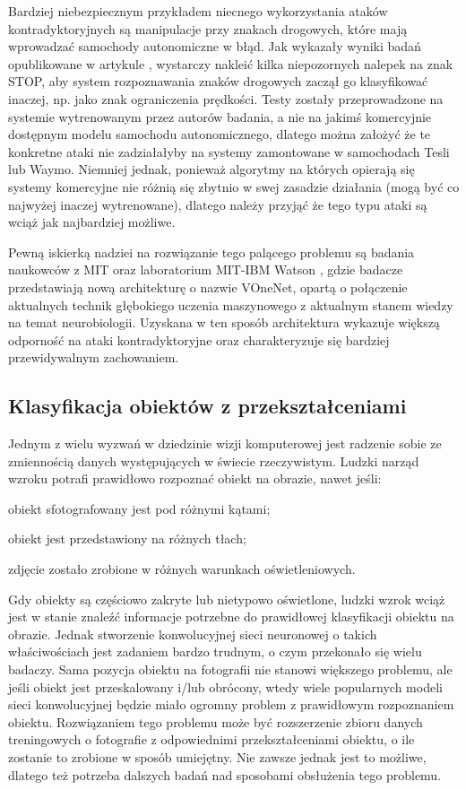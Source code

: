 Bardziej niebezpiecznym przykładem niecnego wykorzystania ataków kontradyktoryjnych są manipulacje przy znakach drogowych, które mają wprowadzać samochody autonomiczne w błąd. Jak wykazały wyniki badań opublikowane w artykule \cite{adversarial:roadSignAttacks}, wystarczy nakleić kilka niepozornych nalepek na znak STOP, aby system rozpoznawania znaków drogowych zaczął go klasyfikować inaczej, np. jako znak ograniczenia prędkości. Testy zostały przeprowadzone na systemie wytrenowanym przez autorów badania, a nie na jakimś komercyjnie dostępnym modelu samochodu autonomicznego, dlatego można założyć że te konkretne ataki nie zadziałałyby na systemy zamontowane w samochodach Tesli lub Waymo. Niemniej jednak, ponieważ algorytmy na których opierają się systemy komercyjne nie różnią się zbytnio w swej zasadzie działania (mogą być co najwyżej inaczej wytrenowane), dlatego należy przyjąć że tego typu ataki są wciąż jak najbardziej możliwe.

Pewną iskierką nadziei na rozwiązanie tego palącego problemu są badania naukowców z MIT oraz laboratorium MIT-IBM Watson \cite{cnns:neuroscienceProtection}, gdzie badacze przedstawiają nową architekturę o nazwie VOneNet, opartą o połączenie aktualnych technik głębokiego uczenia maszynowego z aktualnym stanem wiedzy na temat neurobiologii. Uzyskana w ten sposób architektura wykazuje większą odporność na ataki kontradyktoryjne oraz charakteryzuje się bardziej przewidywalnym zachowaniem.

\subsection{Klasyfikacja obiektów z przekształceniami}
Jednym z wielu wyzwań w dziedzinie wizji komputerowej jest radzenie sobie ze zmiennością danych występujących w świecie rzeczywistym. Ludzki narząd wzroku potrafi prawidłowo rozpoznać obiekt na obrazie, nawet jeśli:
\vspace{-0.5cm}
\begin{itemize*}
\item obiekt sfotografowany jest pod różnymi kątami;
\item obiekt jest przedstawiony na różnych tłach;
\item zdjęcie zostało zrobione w różnych warunkach oświetleniowych.
\end{itemize*}

Gdy obiekty są częściowo zakryte lub nietypowo oświetlone, ludzki wzrok wciąż jest w stanie znaleźć informacje potrzebne do prawidłowej klasyfikacji obiektu na obrazie. Jednak stworzenie konwolucyjnej sieci neuronowej o takich właściwościach jest zadaniem bardzo trudnym, o czym przekonało się wielu badaczy. Sama pozycja obiektu na fotografii nie stanowi większego problemu, ale jeśli obiekt jest przeskalowany i/lub obrócony, wtedy wiele popularnych modeli sieci konwolucyjnej będzie miało ogromny problem z prawidłowym rozpoznaniem obiektu. Rozwiązaniem tego problemu może być rozszerzenie zbioru danych treningowych o fotografie z odpowiednimi przekształceniami obiektu, o ile zostanie to zrobione w sposób umiejętny. Nie zawsze jednak jest to możliwe, dlatego też potrzeba dalszych badań nad sposobami obsłużenia tego problemu. \\

